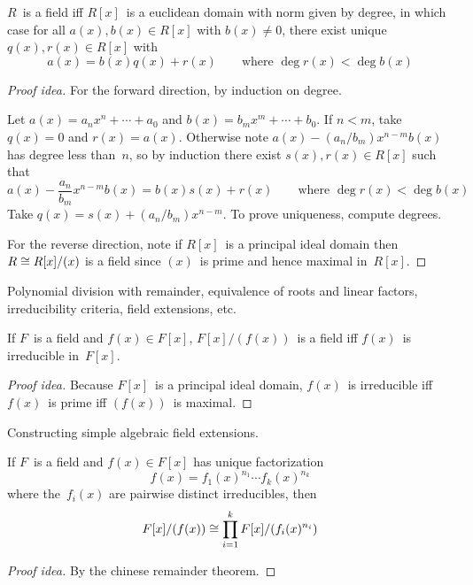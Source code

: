\begin{thm}
\(R\)~is a field iff \(R[x]\)~is a euclidean domain with norm given by degree, in which case for all \(a(x),b(x)\in R[x]\) with \(b(x)\ne0\), there exist unique \(q(x),r(x)\in R[x]\) with
\[a(x)=b(x)q(x)+r(x)\qquad\text{where }\deg r(x)<\deg b(x)\]
\end{thm}
\begin{proof}[Proof idea]
For the forward direction, by induction on degree.

Let \(a(x)=a_nx^n+\cdots+a_0\) and \(b(x)=b_mx^m+\cdots+b_0\). If \(n<m\), take \(q(x)=0\) and \(r(x)=a(x)\). Otherwise note \(a(x)-(a_n/b_m)x^{n-m}b(x)\) has degree less than~\(n\), so by induction there exist \(s(x),r(x)\in R[x]\) such that
\[a(x)-\frac{a_n}{b_m}x^{n-m}b(x)=b(x)s(x)+r(x)\qquad\text{where }\deg r(x)<\deg b(x)\]
Take \(q(x)=s(x)+(a_n/b_m)x^{n-m}\). To prove uniqueness, compute degrees.

For the reverse direction, note if \(R[x]\)~is a principal ideal domain then \(R\cong R[x]/(x)\) is a field since \((x)\)~is prime and hence maximal in~\(R[x]\).
\end{proof}
\begin{app}
Polynomial division with remainder, equivalence of roots and linear factors, irreducibility criteria, field extensions, etc.
\end{app}
\begin{cor}
If \(F\)~is a field and \(f(x)\in F[x]\), \(F[x]/(f(x))\)~is a field iff \(f(x)\)~is irreducible in~\(F[x]\).
\end{cor}
\begin{proof}[Proof idea]
Because \(F[x]\)~is a principal ideal domain, \(f(x)\)~is irreducible iff \(f(x)\)~is prime iff \((f(x))\)~is maximal.
\end{proof}
\begin{app}
Constructing simple algebraic field extensions.
\end{app}
\begin{cor}
If \(F\)~is a field and \(f(x)\in F[x]\) has unique factorization
\[f(x)=f_1(x)^{n_1}\cdots f_k(x)^{n_k}\]
where the~\(f_i(x)\) are pairwise distinct irreducibles, then
\[F[x]/(f(x))\cong\prod_{i=1}^k F[x]/(f_i(x)^{n_i})\]
\end{cor}
\begin{proof}[Proof idea]
By the chinese remainder theorem.
\end{proof}

